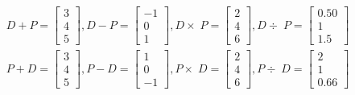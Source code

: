 \documentclass[UTF8,a4paper,notitlepage,openany,plain,final]{ctexbook}
\begin{document}
    \[ \begin{split}
        D + P =
        \begin{bmatrix}
            3 \\
            4 \\
            5
        \end{bmatrix}
        , D - P =
        \begin{bmatrix}
            -1 \\
            0 \\
            1
        \end{bmatrix}
        , D \times\; P =
        \begin{bmatrix}
            2 \\
            4 \\
            6
        \end{bmatrix}
        , D \div\; P =
        \begin{bmatrix}
            0.50 \\
            1 \\
            1.5
        \end{bmatrix}
        \\
        P + D =
        \begin{bmatrix}
            3 \\
            4 \\
            5
        \end{bmatrix}
        , P - D =
        \begin{bmatrix}
            1 \\
            0 \\
            -1
        \end{bmatrix}
        , P \times\; D =
        \begin{bmatrix}
            2 \\
            4 \\
            6
        \end{bmatrix}
        , P \div\; D =
        \begin{bmatrix}
            2 \\
            1 \\
            0.66
        \end{bmatrix}
    \end{split} \]
\end{document}
